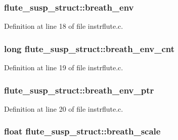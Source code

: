 \subsubsection[{\texorpdfstring{breath\+\_\+env}{breath_env}}]{ flute\+\_\+susp\+\_\+struct\+::breath\+\_\+env}\hypertarget{structflute__susp__struct_acefc0e8b254cc7f1d030f6b65a629d66}{}\label{structflute__susp__struct_acefc0e8b254cc7f1d030f6b65a629d66}


Definition at line 18 of file instrflute.\+c.

\subsubsection[{\texorpdfstring{breath\+\_\+env\+\_\+cnt}{breath_env_cnt}}]{\setlength{\rightskip}{0pt plus 5cm}long flute\+\_\+susp\+\_\+struct\+::breath\+\_\+env\+\_\+cnt}\hypertarget{structflute__susp__struct_a1fed01857c97251f2c2a55ad93ae68c7}{}\label{structflute__susp__struct_a1fed01857c97251f2c2a55ad93ae68c7}


Definition at line 19 of file instrflute.\+c.

\subsubsection[{\texorpdfstring{breath\+\_\+env\+\_\+ptr}{breath_env_ptr}}]{ flute\+\_\+susp\+\_\+struct\+::breath\+\_\+env\+\_\+ptr}\hypertarget{structflute__susp__struct_a41a775f86ac5f44d93c06de861226ae1}{}\label{structflute__susp__struct_a41a775f86ac5f44d93c06de861226ae1}


Definition at line 20 of file instrflute.\+c.

\subsubsection[{\texorpdfstring{breath\+\_\+scale}{breath_scale}}]{\setlength{\rightskip}{0pt plus 5cm}float flute\+\_\+susp\+\_\+struct\+::breath\+\_\+scale}\hypertarget{structflute__susp__struct_ac9523e1324decebb595b41123a6c354d}{}\label{structflute__susp__struct_ac9523e1324decebb595b41123a6c354d}


